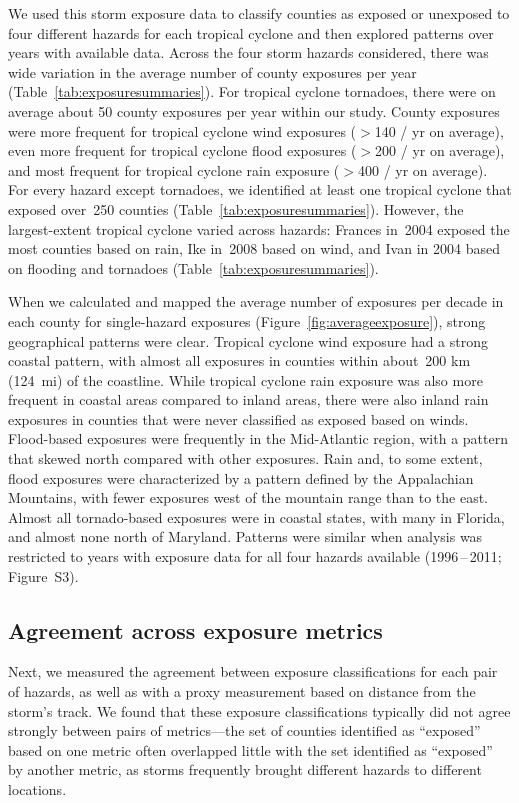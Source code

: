 We used this storm exposure data to classify counties as exposed or unexposed
to four different hazards for each tropical cyclone and then explored patterns
over years with available data. Across the four storm hazards considered, there
was wide variation in the average number of county exposures per year
(Table~\ref{tab:exposuresummaries}). For tropical cyclone tornadoes,
there were on average about 50 county exposures per year within our study.
County exposures were more frequent for tropical cyclone wind exposures ($>$140
/ yr on average), even more frequent for tropical cyclone flood exposures
($>$200 / yr on average), and most frequent for tropical cyclone rain exposure
($>$400 / yr on average). For every hazard except tornadoes, we identified at
least one tropical cyclone that exposed over~250 counties
(Table~\ref{tab:exposuresummaries}).  However, the largest-extent tropical
cyclone varied across hazards: Frances in~2004 exposed the most counties based
on rain, Ike in~2008 based on wind, and Ivan in 2004 based on flooding and
tornadoes (Table~\ref{tab:exposuresummaries}).

When we calculated and mapped the average number of exposures per decade in
each county for single-hazard exposures (Figure~\ref{fig:averageexposure}),
strong geographical patterns were clear. Tropical cyclone wind exposure had a
strong coastal pattern, with almost all exposures in counties within about~200
\si{\kilo\metre} (124~mi) of the coastline. While tropical cyclone rain
exposure was also more frequent in coastal areas compared to inland areas,
there were also inland rain exposures in counties that were never classified as
exposed based on winds. Flood-based exposures were frequently in the
Mid-Atlantic region, with a pattern that skewed north compared with other
exposures. Rain and, to some extent, flood exposures were characterized by a
pattern defined by the Appalachian Mountains, with fewer exposures west of the
mountain range than to the east. Almost all tornado-based exposures were in
coastal states, with many in Florida, and almost none north of Maryland.
Patterns were similar when analysis was restricted to years with exposure data
for all four hazards available (1996\,--\,2011; Figure~S3). 

\subsection*{Agreement across exposure metrics}

Next, we measured the agreement between exposure classifications for each pair
of hazards, as well as with a proxy measurement based on
distance from the storm's track. We found that these exposure classifications
typically did not agree strongly between pairs of metrics---the set of counties
identified as ``exposed'' based on one metric often overlapped little with the set
identified as ``exposed'' by another metric, as storms frequently brought
different hazards to different locations. 

